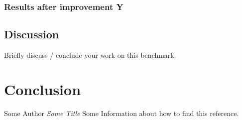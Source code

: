 \documentclass[twocolumn]{article}
\begin{document}
\subsubsection{Results after improvement Y}
\subsection{Discussion}
Briefly discuss / conclude your work on this benchmark.

\section{Conclusion}

\begin{thebibliography}{}
Some Author
\textit{Some Title}
Some Information about how to find this reference.
\end{thebibliography}
\end{document}
